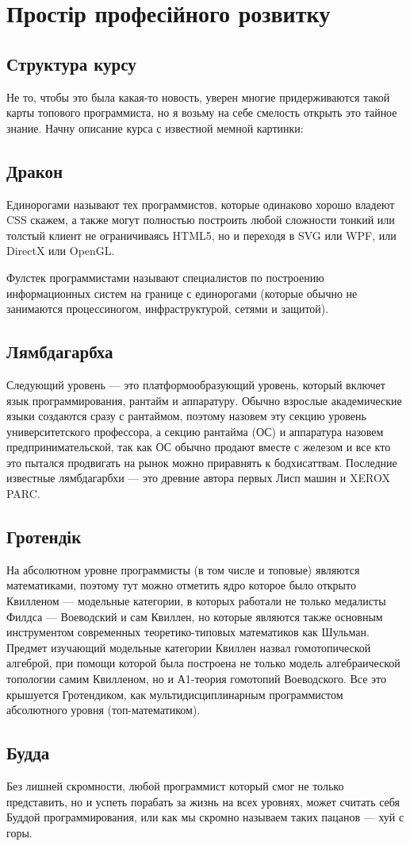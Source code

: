 \section{Простір професійного розвитку}

\subsection{Структура курсу}

Не то, чтобы это была какая-то новость, уверен многие придерживаются такой карты топового программиста, но я возьму на себе смелость открыть это тайное знание. Начну описание курса с известной мемной картинки:

\subsection{Дракон}

Единорогами называют тех программистов, которые одинаково хорошо владеют CSS скажем, а также могут полностью построить любой сложности тонкий или толстый клиент не ограничиваясь HTML5, но и переходя в SVG или WPF, или DirectX или OpenGL.

Фулстек программистами называют специалистов по построению информационных систем на границе с единорогами (которые обычно не занимаются процессиногом, инфраструктурой, сетями и защитой).

\subsection{Лямбдагарбха}

Следующий уровень — это платформообразующий уровень, который включет язык программирования, рантайм и аппаратуру. Обычно взрослые академические языки создаются сразу с рантаймом, поэтому назовем эту секцию уровень университетского профессора, а секцию рантайма (ОС) и аппаратура назовем предпринимательской, так как ОС обычно продают вместе с железом и все кто это пытался продвигать на рынок можно приравнять к бодхисаттвам. Последние известные лямбдагарбхи — это древние автора первых Лисп машин и XEROX PARC.

\subsection{Гротендік}

На абсолютном уровне программисты (в том числе и топовые) являются математиками, поэтому тут можно отметить ядро которое было открыто Квилленом — модельные категории, в которых работали не только медалисты Филдса — Воеводский и сам Квиллен, но которые являются также основным инструментом современных теоретико-типовых математиков как Шульман. Предмет изучающий модельные категории Квиллен назвал гомотопической алгеброй, при помощи которой была построена не только модель алгебраической топологии самим Квилленом, но и А1-теория гомотопий Воеводского. Все это крышуется Гротендиком, как мультидисциплинарным программистом абсолютного уровня (топ-математиком).

\subsection{Будда}

Без лишней скромности, любой программист который смог не только представить, но и успеть порабать за жизнь на всех уровнях, может считать себя Буддой программирования, или как мы скромно называем таких пацанов — хуй с горы.

\normalsize
